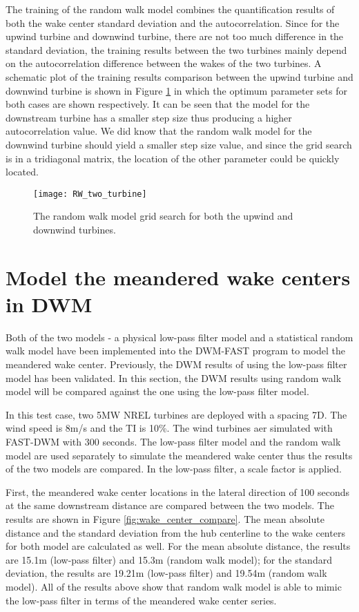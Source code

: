 \documentclass{umthesis}
\begin{document}
The training of the random walk model combines the quantification results of both the wake center standard deviation and the autocorrelation. Since for the upwind turbine and downwind turbine, there are not too much difference in the standard deviation, the training results between the two turbines mainly depend on the autocorrelation difference between the wakes of the two turbines. A schematic plot of the training results comparison between the upwind turbine and downwind turbine is shown in Figure \ref{fig:rw_two_turbine} in which the optimum parameter sets for both cases are shown respectively. It can be seen that the model for the downstream turbine has a smaller step size thus producing a higher autocorrelation value. We did know that the random walk model for the downwind turbine should yield a smaller step size value, and since the grid search is in a tridiagonal matrix, the location of the other parameter could be quickly located. 

\begin{figure}
  \centering
  \texttt{[image: RW\_two\_turbine]}
  \caption{The random walk model grid search for both the upwind and downwind turbines.}\label{fig:rw_two_turbine}
\end{figure}

\section{Model the meandered wake centers in DWM}\label{sec:RW_detail}
Both of the two models - a physical low-pass filter model and a statistical random walk model have been implemented into the DWM-FAST program to model the meandered wake center. Previously, the DWM results of using the low-pass filter model has been validated. In this section, the DWM results using random walk model will be compared against the one using the low-pass filter model.

In this test case, two 5MW NREL turbines are deployed with a spacing 7D. The wind speed is 8m/s and the TI is 10\%. The wind turbines aer simulated with FAST-DWM with 300 seconds. The low-pass filter model and the random walk model are used separately to simulate the meandered wake center thus the results of the two models are compared. In the low-pass filter, a scale factor is applied.

First, the meandered wake center locations in the lateral direction of 100 seconds at the same downstream distance are compared between the two models. The results are shown in Figure \ref{fig:wake_center_compare}. The mean absolute distance and the standard deviation from the hub centerline to the wake centers for both model are calculated as well. For the mean absolute distance, the results are 15.1m (low-pass filter) and 15.3m (random walk model); for the standard deviation, the results are 19.21m (low-pass filter) and 19.54m (random walk model). All of the results above show that random walk model is able to mimic the low-pass filter in terms of the meandered wake center series.   
\end{document}

